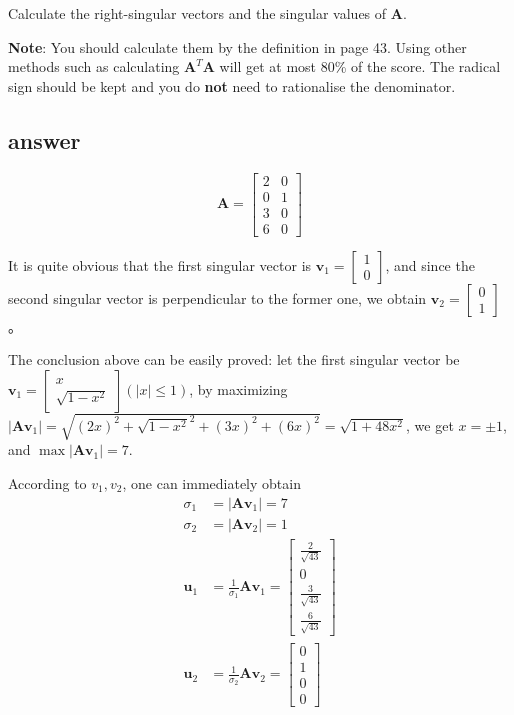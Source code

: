 \documentclass[12pt]{article}
\begin{document}
Calculate the right-singular vectors and the singular values of $\mathbf{A}$.

\textbf{Note}: You should calculate them by the definition in page 43. Using other methods such as calculating $\mathbf{A}^{T}\mathbf{A}$ will get at most 80\% of the score. The radical sign should be kept and you do \textbf{not} need to rationalise the denominator.
    
\subsection*{answer}

$$\mathbf A = \begin{bmatrix}
2 & 0\\
0 & 1\\
3 & 0\\
6 & 0
\end{bmatrix}$$

It is quite obvious that the first singular vector is $\mathbf v_1 = \begin{bmatrix}
1\\0
\end{bmatrix}$, and since the second singular vector is perpendicular to the former one, we obtain $\mathbf v_2 = \begin{bmatrix}
0\\1
\end{bmatrix}$。

The conclusion above can be easily proved: let the first singular vector be $\mathbf v_1 = \begin{bmatrix}
x\\\sqrt{1-x^2}
\end{bmatrix}(|x| \le 1)$, by maximizing $|\mathbf A\mathbf v_1| = \sqrt{(2x)^2 + \sqrt{1-x^2}^2 + (3x)^2 + (6x)^2} = \sqrt{1 + 48x^2}$, we get $x = \pm 1$, and $\max|\mathbf A\mathbf v_1| = 7$.

According to $v_1, v_2$, one can immediately obtain
\begin{align*}
\sigma_1 &= |\mathbf A\mathbf v_1| = 7\\
\sigma_2 &= |\mathbf A\mathbf v_2| = 1\\
\mathbf u_1 &= \frac{1}{\sigma_1}\mathbf A\mathbf v_1 = \begin{bmatrix}
\frac{2}{\sqrt{43}}\\0\\\frac{3}{\sqrt{43}}\\\frac{6}{\sqrt{43}}
\end{bmatrix}\\
\mathbf u_2 &= \frac{1}{\sigma_2}\mathbf A\mathbf v_2 = \begin{bmatrix}
0\\1\\0\\0
\end{bmatrix}\end{align*}
\end{document}

